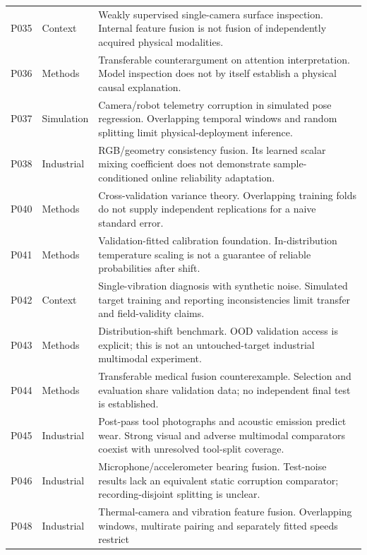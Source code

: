 \begin{longtable}{@{}P{.25\textwidth}P{.16\textwidth}P{.53\textwidth}@{}}
P035 \parencite{P035} & Context & Weakly supervised single-camera surface inspection.
Internal feature fusion is not fusion of independently acquired physical modalities. \\
P036 \parencite{P036} & Methods & Transferable counterargument on attention interpretation.
Model inspection does not by itself establish a physical causal explanation. \\
P037 \parencite{Altinses2023Fuzzy} & Simulation & Camera/robot telemetry corruption in
simulated pose regression. Overlapping temporal windows and random splitting limit
physical-deployment inference. \\
P038 \parencite{P038} & Industrial & RGB/geometry consistency fusion. Its learned scalar
mixing coefficient does not demonstrate sample-conditioned online reliability
adaptation. \\
P040 \parencite{Bengio2004CVVariance} & Methods & Cross-validation variance theory.
Overlapping training folds do not supply independent replications for a naive standard
error. \\
P041 \parencite{Guo2017Calibration} & Methods & Validation-fitted calibration foundation.
In-distribution temperature scaling is not a guarantee of reliable probabilities after
shift. \\
P042 \parencite{P042} & Context & Single-vibration diagnosis with synthetic noise. Simulated
target training and reporting inconsistencies limit transfer and field-validity claims.
\\
P043 \parencite{P043} & Methods & Distribution-shift benchmark. OOD validation access is
explicit; this is not an untouched-target industrial multimodal experiment. \\
P044 \parencite{P044} & Methods & Transferable medical fusion counterexample. Selection and
evaluation share validation data; no independent final test is established. \\
P045 \parencite{P045} & Industrial & Post-pass tool photographs and acoustic emission
predict wear. Strong visual and adverse multimodal comparators coexist with unresolved
tool-split coverage. \\
P046 \parencite{P046} & Industrial & Microphone/accelerometer bearing fusion. Test-noise
results lack an equivalent static corruption comparator; recording-disjoint splitting is
unclear. \\
P048 \parencite{P048} & Industrial & Thermal-camera and vibration feature fusion.
Overlapping windows, multirate pairing and separately fitted speeds restrict

\end{longtable}
